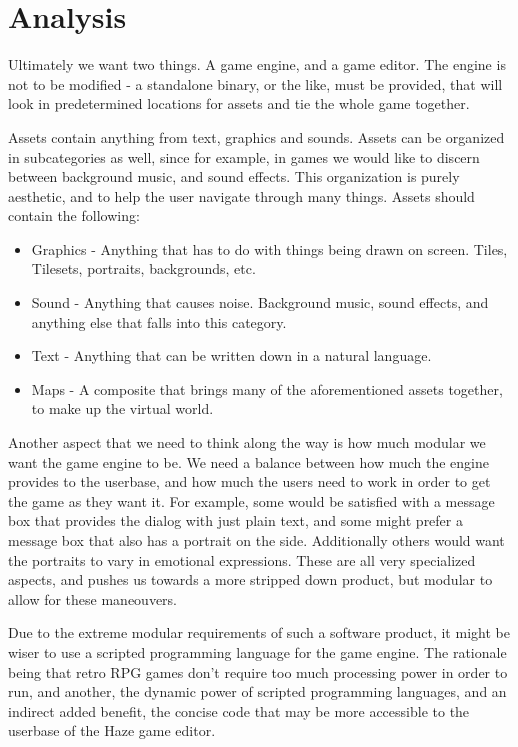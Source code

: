 \section{Analysis}

Ultimately we want two things. A game engine, and a game editor. The engine is 
not to be modified - a standalone binary, or the like, must be provided, that 
will look in predetermined locations for assets and tie the whole game
together.

Assets contain anything from text, graphics and sounds. Assets can be organized
in subcategories as well, since for example, in games we would like to discern
between background music, and sound effects. This organization is purely
aesthetic, and to help the user navigate through many things. Assets should 
contain the following:

\begin{itemize}
\item Graphics - Anything that has to do with things being drawn on screen.
Tiles, Tilesets, portraits, backgrounds, etc.
\item Sound - Anything that causes noise. Background music, sound effects, and
anything else that falls into this category.
\item Text - Anything that can be written down in a natural language.
\item Maps - A composite that brings many of the aforementioned assets
together, to make up the virtual world.
\end{itemize}

Another aspect that we need to think along the way is how much modular we want 
the game engine to be. We need a balance between how much the engine provides
to the userbase, and how much the users need to work in order to get the game
as they want it. For example, some would be satisfied with a message box that 
provides the dialog with just plain text, and some might prefer a message box
that also has a portrait on the side. Additionally others would want the 
portraits to vary in emotional expressions. These are all very specialized
aspects, and pushes us towards a more stripped down product, but modular to
allow for these maneouvers. 

Due to the extreme modular requirements of such a software product, it might be
wiser to use a scripted programming language for the game engine. The rationale
being that retro RPG games don't require too much processing power in order to 
run, and another, the dynamic power of scripted programming languages, and an
indirect added benefit, the concise code that may be more accessible to the
userbase of the Haze game editor.


